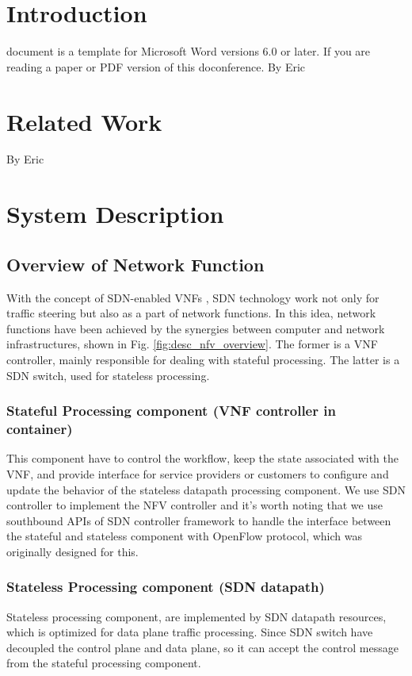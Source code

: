 \documentclass[journal]{IEEEtran}
\begin{document}
\section{Introduction}
 document is a template for Microsoft Word versions 6.0 or later. If you are reading a paper or PDF version of this doconference.
By Eric





\section{Related Work}
By Eric





\section{System Description}
\subsection{Overview of Network Function}\label{ssec:desc_nfv_overview}
With the concept of SDN-enabled VNFs \cite{sdn-enabled}, SDN technology work not only for traffic steering but also as a part of network functions. In this idea, network functions have been achieved by the synergies between computer and network infrastructures, shown in Fig. \ref{fig:desc_nfv_overview}. The former is a VNF controller, mainly responsible for dealing with stateful processing. The latter is a SDN switch, used for stateless processing.

\subsubsection{Stateful Processing component (VNF controller in container)}
This component have to control the workflow, keep the state associated with the VNF, and provide interface for service providers or customers to configure and update the behavior of the stateless datapath processing component. We use SDN controller to implement the NFV controller and it’s worth noting that we use southbound APIs of SDN controller framework to handle the interface between the stateful and stateless component with OpenFlow protocol, which was originally designed for this.

\subsubsection{Stateless Processing component (SDN datapath)}
Stateless processing component, are implemented by SDN datapath resources, which is optimized for data plane traffic processing. Since SDN switch have decoupled the control plane and data plane, so it can accept the control message from the stateful processing component.
\end{document}
